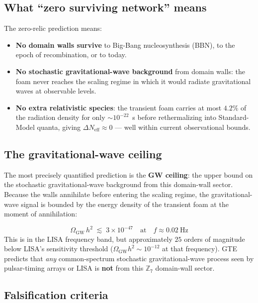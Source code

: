 \documentclass[11pt,a4paper]{article}
\newcommand{\term}[1]{\textbf{#1}}
\newcommand{\ZS}{\mathbb{Z}_7}
\begin{document}
\subsection{What ``zero surviving network'' means}

The zero-relic prediction means:
\begin{itemize}
\item \textbf{No domain walls survive} to Big-Bang nucleosynthesis (BBN),
      to the epoch of recombination, or to today.
\item \textbf{No stochastic gravitational-wave background} from domain walls:
      the foam never reaches the scaling regime in which it would radiate
      gravitational waves at observable levels.
\item \textbf{No extra relativistic species}: the transient foam carries at most
      $4.2\%$ of the radiation density for only $\sim 10^{-22}$~s before
      rethermalizing into Standard-Model quanta, giving $\Delta N_\mathrm{eff}
      \approx 0$ --- well within current observational bounds.
\end{itemize}

\subsection{The gravitational-wave ceiling}

The most precisely quantified prediction is the \term{GW ceiling}:
the upper bound on the stochastic gravitational-wave background from this
domain-wall sector.
Because the walls annihilate before entering the scaling regime, the
gravitational-wave signal is bounded by the energy density of the
transient foam at the moment of annihilation:

\begin{tcolorbox}[colback=boxgreen,colframe=green!50!black,
  title={Gravitational-wave ceiling (GTE zero-relic prediction)}]
\[
  \Omega_\mathrm{GW}\,h^2 \;\lesssim\; 3\times10^{-47}
  \quad\text{at}\quad f \approx 0.02~\text{Hz}
\]
This is in the LISA frequency band, but approximately $25$ orders of magnitude
below LISA's sensitivity threshold ($\Omega_\mathrm{GW} h^2 \sim 10^{-12}$
at that frequency).
GTE predicts that \emph{any} common-spectrum stochastic gravitational-wave
process seen by pulsar-timing arrays or LISA is \textbf{not} from this
$\ZS$ domain-wall sector.
\end{tcolorbox}

\subsection{Falsification criteria}
\end{document}
